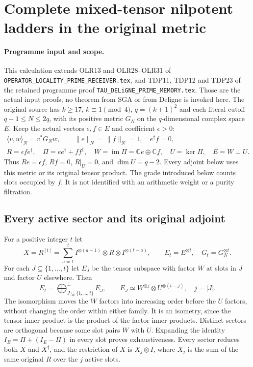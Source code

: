 \section{Complete mixed-tensor nilpotent ladders in the original metric}
\label{sec:mixed-tensor-nilpotent-ladders}

\paragraph{Programme input and scope.}
This calculation extends OLR13 and OLR28--OLR31 of
\texttt{OPERATOR\_LOCALITY\_PRIME\_RECEIVER.tex}, and TDP11,
TDP12 and TDP23 of the retained programme proof
\texttt{TAU\_DELiGNE\_PRIME\_MEMORY.tex}.
Those are the actual input proofs; no theorem from SGA or from
Deligne is invoked here. The original source has
$k\ge17$, $k\equiv1\pmod4$, $q=(k+1)^2$ and each literal cutoff
$q-1\le N\le2q$, with its positive metric $G_N$ on the
$q$-dimensional complex space $E$.
Keep the actual vectors $e,f\in E$ and coefficient $\epsilon>0$:
\[
\begin{gathered}
\langle v,w\rangle_N=v^*G_Nw,\qquad
\|e\|_N=\|f\|_N=1,\quad e^\dagger f=0,\\
R=\epsilon fe^\dagger,\quad
\Pi=ee^\dagger+ff^\dagger,\quad
W=\operatorname{im}\Pi=\mathbb Ce\oplus\mathbb Cf,\quad
U=\ker\Pi,\quad E=W\mathbin\perp U.
\end{gathered}
\tag{OLM1}
\]
Thus $Re=\epsilon f$, $Rf=0$, $R|_U=0$, and $\dim U=q-2$.
Every adjoint below uses this metric or its original tensor product.
The grade introduced below counts slots occupied by $f$. It is
not identified with an arithmetic weight or a purity filtration.

\subsection{Every active sector and its original adjoint}

For a positive integer $t$ let
\[
X=R^{[t]}=\sum_{a=1}^t I^{\otimes(a-1)}\otimes R
                         \otimes I^{\otimes(t-a)},
\qquad E_t=E^{\otimes t},\quad G_t=G_N^{\otimes t}.
\tag{OLM2}
\]
For each $J\subseteq\{1,\ldots,t\}$ let $E_J$ be the tensor
subspace with factor $W$ at slots in $J$ and factor $U$ elsewhere.
Then
\[
E_t=\mathop{\bigoplus}_{J\subseteq\{1,\ldots,t\}}^{\perp}E_J,
\qquad
E_J\simeq W^{\otimes j}\otimes U^{\otimes(t-j)},
\quad j=|J|.
\tag{OLM3}
\]
The isomorphism moves the $W$ factors into increasing order before
the $U$ factors, without changing the order within either family.
It is an isometry, since the tensor inner product is the product
of the factor inner products. Distinct sectors are orthogonal
because some slot pairs $W$ with $U$. Expanding the identity
$I_E=\Pi+(I_E-\Pi)$ in every slot proves exhaustiveness.
Every sector reduces both $X$ and $X^\dagger$, and the restriction
of $X$ is $X_j\otimes I$, where $X_j$ is the sum of the same
original $R$ over the $j$ active slots.

